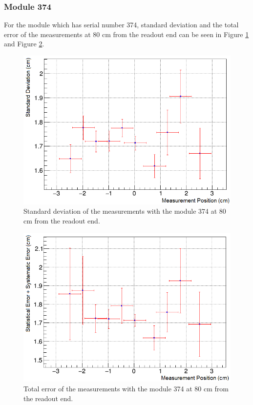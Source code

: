 \documentclass[a4paper]{article}\linespread{1.4}
\begin{document}
\subsubsection{Module 374} 
For the module which has serial number 374, standard deviation and the total error of the measurements at 80 cm from the readout end can be seen in Figure \ref{fig:74s} and Figure \ref{fig:74e}.
\begin{figure}[h!] \hspace*{-0cm} \includegraphics[width=120mm,scale=2.0]{figures/74s.png} \caption{Standard deviation of the measurements with the module 374 at 80 cm from the readout end.}  \label{fig:74s}\end{figure}
\begin{figure}[h!] \hspace*{-0cm} \includegraphics[width=120mm,scale=2.0]{figures/74e.png} \caption{Total error of the measurements with the module 374 at 80 cm from the readout end.}  \label{fig:74e}\end{figure}
\end{document}
